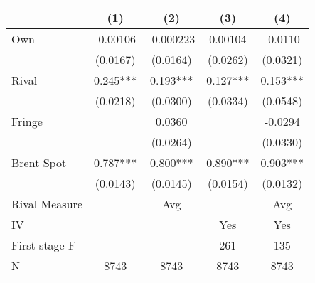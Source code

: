 {
\def\sym#1{\ifmmode^{#1}\else\(^{#1}\)\fi}
\begin{tabular}{l*{4}{c}}
\toprule
                &\multicolumn{1}{c}{(1)}   &\multicolumn{1}{c}{(2)}   &\multicolumn{1}{c}{(3)}   &\multicolumn{1}{c}{(4)}   \\
\midrule
Own             & -0.00106   &-0.000223   &  0.00104   &  -0.0110   \\
                & (0.0167)   & (0.0164)   & (0.0262)   & (0.0321)   \\
\addlinespace
Rival           &    0.245***&    0.193***&    0.127***&    0.153***\\
                & (0.0218)   & (0.0300)   & (0.0334)   & (0.0548)   \\
\addlinespace
Fringe          &            &   0.0360   &            &  -0.0294   \\
                &            & (0.0264)   &            & (0.0330)   \\
\addlinespace
Brent Spot      &    0.787***&    0.800***&    0.890***&    0.903***\\
                & (0.0143)   & (0.0145)   & (0.0154)   & (0.0132)   \\
\midrule
Rival Measure   &            &      Avg   &            &      Avg   \\
IV              &            &            &      Yes   &      Yes   \\
First-stage F   &            &            &      261   &      135   \\
N               &     8743   &     8743   &     8743   &     8743   \\
\bottomrule
\end{tabular}
}

